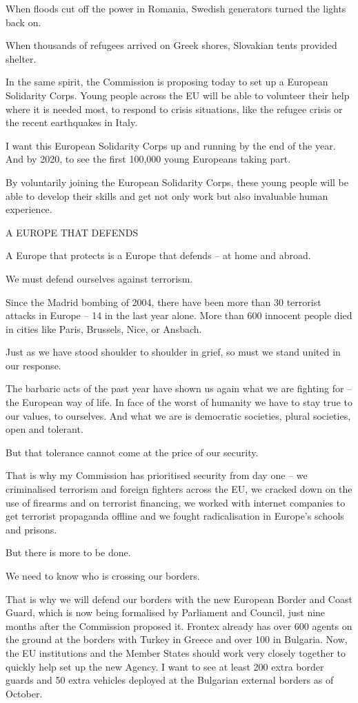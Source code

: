 \documentclass[a4paper,11pt]{article}
\begin{document}
When floods cut off the power in Romania, Swedish generators turned the lights back on.

When thousands of refugees arrived on Greek shores, Slovakian tents provided shelter.

In the same spirit, the Commission is proposing today to set up a European Solidarity Corps. Young people across the EU will be able to volunteer their help where it is needed most, to respond to crisis situations, like the refugee crisis or the recent earthquakes in Italy.

I want this European Solidarity Corps up and running by the end of the year. And by 2020, to see the first 100,000 young Europeans taking part.

By voluntarily joining the European Solidarity Corps, these young people will be able to develop their skills and get not only work but also invaluable human experience.

 

A EUROPE THAT DEFENDS

A Europe that protects is a Europe that defends – at home and abroad.

We must defend ourselves against terrorism.

Since the Madrid bombing of 2004, there have been more than 30 terrorist attacks in Europe – 14 in the last year alone. More than 600 innocent people died in cities like Paris, Brussels, Nice, or Ansbach.

Just as we have stood shoulder to shoulder in grief, so must we stand united in our response.

The barbaric acts of the past year have shown us again what we are fighting for – the European way of life. In face of the worst of humanity we have to stay true to our values, to ourselves. And what we are is democratic societies, plural societies, open and tolerant.

But that tolerance cannot come at the price of our security.

That is why my Commission has prioritised security from day one – we criminalised terrorism and foreign fighters across the EU, we cracked down on the use of firearms and on terrorist financing, we worked with internet companies to get terrorist propaganda offline and we fought radicalisation in Europe's schools and prisons.

But there is more to be done.

We need to know who is crossing our borders.

That is why we will defend our borders with the new European Border and Coast Guard, which is now being formalised by Parliament and Council, just nine months after the Commission proposed it. Frontex already has over 600 agents on the ground at the borders with Turkey in Greece and over 100 in Bulgaria. Now, the EU institutions and the Member States should work very closely together to quickly help set up the new Agency. I want to see at least 200 extra border guards and 50 extra vehicles deployed at the Bulgarian external borders as of October.
\end{document}

